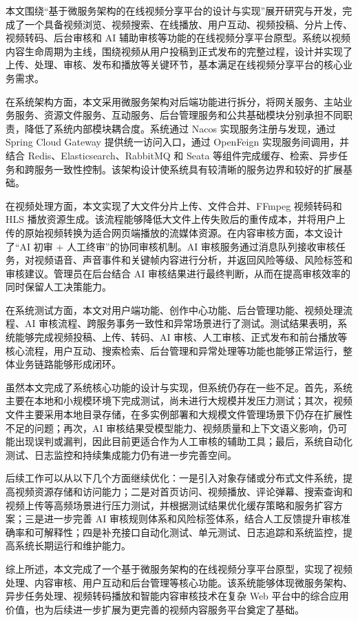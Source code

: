 
\begin{conclusion}
本文围绕“基于微服务架构的在线视频分享平台的设计与实现”展开研究与开发，完成了一个具备视频浏览、视频搜索、在线播放、用户互动、视频投稿、分片上传、视频转码、后台审核和 AI 辅助审核等功能的在线视频分享平台原型。系统以视频内容生命周期为主线，围绕视频从用户投稿到正式发布的完整过程，设计并实现了上传、处理、审核、发布和播放等关键环节，基本满足在线视频分享平台的核心业务需求。

在系统架构方面，本文采用微服务架构对后端功能进行拆分，将网关服务、主站业务服务、资源文件服务、互动服务、后台管理服务和公共基础模块分别承担不同职责，降低了系统内部模块耦合度。系统通过 Nacos 实现服务注册与发现，通过 Spring Cloud Gateway 提供统一访问入口，通过 OpenFeign 实现服务间调用，并结合 Redis、Elasticsearch、RabbitMQ 和 Seata 等组件完成缓存、检索、异步任务和跨服务一致性控制。该架构设计使系统具有较清晰的服务边界和较好的扩展基础。

在视频处理方面，本文实现了大文件分片上传、文件合并、FFmpeg 视频转码和 HLS 播放资源生成。该流程能够降低大文件上传失败后的重传成本，并将用户上传的原始视频转换为适合网页端播放的流媒体资源。在内容审核方面，本文设计了“AI 初审 + 人工终审”的协同审核机制。AI 审核服务通过消息队列接收审核任务，对视频语音、声音事件和关键帧内容进行分析，并返回风险等级、风险标签和审核建议。管理员在后台结合 AI 审核结果进行最终判断，从而在提高审核效率的同时保留人工决策能力。

在系统测试方面，本文对用户端功能、创作中心功能、后台管理功能、视频处理流程、AI 审核流程、跨服务事务一致性和异常场景进行了测试。测试结果表明，系统能够完成视频投稿、上传、转码、AI 审核、人工审核、正式发布和前台播放等核心流程，用户互动、搜索检索、后台管理和异常处理等功能也能够正常运行，整体业务链路能够形成闭环。

虽然本文完成了系统核心功能的设计与实现，但系统仍存在一些不足。首先，系统主要在本地和小规模环境下完成测试，尚未进行大规模并发压力测试；其次，视频文件主要采用本地目录存储，在多实例部署和大规模文件管理场景下仍存在扩展性不足的问题；再次，AI 审核结果受模型能力、视频质量和上下文语义影响，仍可能出现误判或漏判，因此目前更适合作为人工审核的辅助工具；最后，系统自动化测试、日志监控和持续集成能力仍有进一步完善空间。

后续工作可以从以下几个方面继续优化：一是引入对象存储或分布式文件系统，提高视频资源存储和访问能力；二是对首页访问、视频播放、评论弹幕、搜索查询和视频上传等高频场景进行压力测试，并根据测试结果优化缓存策略和服务扩容方案；三是进一步完善 AI 审核规则体系和风险标签体系，结合人工反馈提升审核准确率和可解释性；四是补充接口自动化测试、单元测试、日志追踪和系统监控，提高系统长期运行和维护能力。

综上所述，本文完成了一个基于微服务架构的在线视频分享平台原型，实现了视频处理、内容审核、用户互动和后台管理等核心功能。该系统能够体现微服务架构、异步任务处理、视频转码播放和智能内容审核技术在复杂 Web 平台中的综合应用价值，也为后续进一步扩展为更完善的视频内容服务平台奠定了基础。
\end{conclusion}